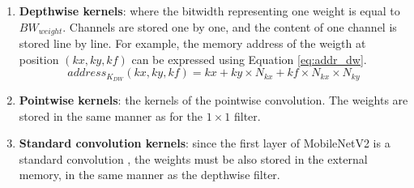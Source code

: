 \begin{enumerate}
    \item \textbf{Depthwise kernels}: where the bitwidth representing one weight is equal to $BW_{weight}$. Channels are stored one by one, and the content of one channel is stored line by line. For example, the memory address of the weigth at position $\left(kx, ky, kf\right)$ can be expressed using Equation \eqref{eq:addr_dw}.
    \begin{equation}
        address_{K_{DW}}(kx, ky, kf) = kx + ky \times N_{kx} + kf \times N_{kx} \times N_{ky}
        \label{eq:addr_dw}
    \end{equation}
    \item \textbf{Pointwise kernels}: the kernels of the pointwise convolution. The weights are stored in the same manner as for the $1 \times 1$ filter.
    \item \textbf{Standard convolution kernels}: since the first layer of MobileNetV2 is a standard convolution \cite{sandler_mobilenetv2_2018}, the weights must be also stored in the external memory, in the same manner as the depthwise filter.
\end{enumerate}

